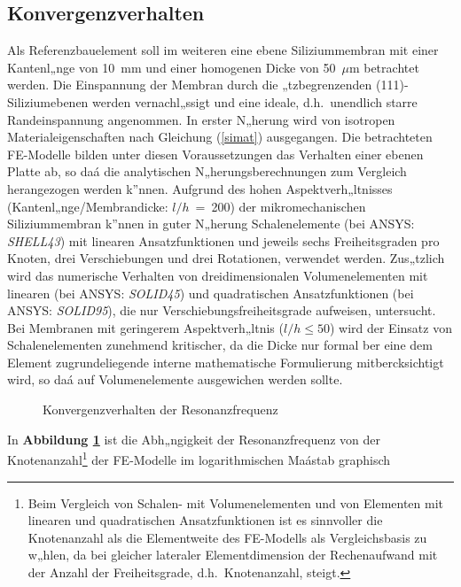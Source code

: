 \subsection{Konvergenzverhalten}
\label{konvergenzverhalten}

Als Referenzbauelement soll im weiteren eine ebene Siliziummembran mit einer
Kantenl„nge von 10~mm und einer homogenen Dicke von 50~$\mu$m betrachtet
werden. Die Einspannung der Membran durch die „tzbegrenzenden
(111)-Siliziumebenen werden vernachl„ssigt und eine ideale, d.h.\
unendlich starre Randeinspannung angenommen. In erster N„herung wird von
isotropen Materialeigenschaften nach Gleichung (\ref{simat}) ausgegangen.
Die betrachteten FE-Modelle bilden unter
diesen Voraussetzungen das Verhalten einer ebenen Platte ab, so daá die
analytischen N„herungsberechnungen zum Vergleich herangezogen werden k”nnen.
Aufgrund des hohen Aspektverh„ltnisses
(Kantenl„nge/Membrandicke: $l/h$~=~200) der mikromechanischen
Siliziummembran k”nnen in guter N„herung Schalenelemente
(bei {\sf ANSYS}: {\em SHELL43})
mit linearen Ansatzfunktionen und jeweils sechs Freiheitsgraden pro Knoten,
drei Verschiebungen und drei Rotationen, verwendet werden.
Zus„tzlich wird das numerische Verhalten von dreidimensionalen
Volumenelementen mit linearen (bei {\sf ANSYS}: {\em SOLID45})
und quadratischen Ansatzfunktionen (bei {\sf ANSYS}: {\em SOLID95}),
die nur Verschiebungsfreiheitsgrade
aufweisen, untersucht. Bei Membranen mit geringerem Aspektverh„ltnis
($l/h \leq 50$) wird der Einsatz von Schalenelementen zunehmend kritischer,
da die Dicke nur formal ber eine dem Element zugrundeliegende interne
mathematische Formulierung mitbercksichtigt wird, so daá auf
Volumenelemente ausgewichen werden sollte.\\
\begin{figure}[htb]
\begin{center}

\setabbve
\end{center}
\caption{\label{abbkonvfreq}
  Konvergenzverhalten der Resonanzfrequenz}
\end{figure}
In {\bf Abbildung \ref{abbkonvfreq}} ist die Abh„ngigkeit der
Resonanzfrequenz von der Knotenanzahl\footnote{Beim Vergleich von Schalen-
mit Volumenelementen und von Elementen mit linearen und quadratischen
Ansatzfunktionen ist es sinnvoller die Knotenanzahl als die Elementweite
des FE-Modells als
Vergleichsbasis zu w„hlen, da bei gleicher lateraler Elementdimension
der Rechenaufwand mit der Anzahl der Freiheitsgrade, d.h.\ Knotenanzahl,
steigt.} der FE-Modelle im logarithmischen Maástab graphisch
